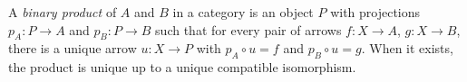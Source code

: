 
A \emph{binary product} of $A$ and $B$ in a category is an object $P$ with projections $p_A:P\to A$ and $p_B:P\to B$ such that for every pair of arrows $f:X\to A$, $g:X\to B$, there is a unique arrow $u:X\to P$ with $p_A\circ u=f$ and $p_B\circ u=g$. When it exists, the product is unique up to a unique compatible isomorphism.
